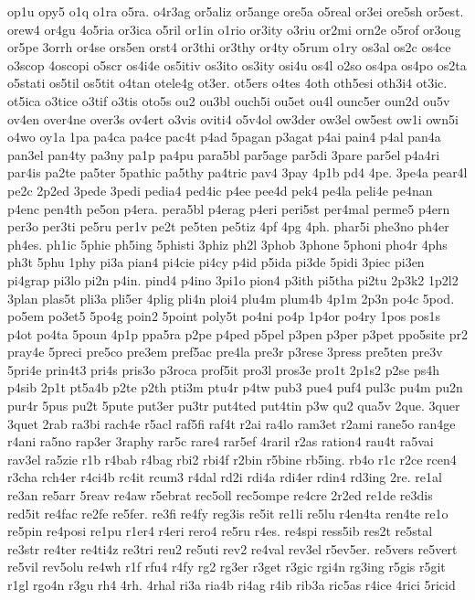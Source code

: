 {op1u
opy5
o1q
o1ra
o5ra.
o4r3ag
or5aliz
or5ange
ore5a
o5real
or3ei
ore5sh
or5est.
orew4
or4gu
4o5ria
or3ica
o5ril
or1in
o1rio
or3ity
o3riu
or2mi
orn2e
o5rof
or3oug
or5pe
3orrh
or4se
ors5en
orst4
or3thi
or3thy
or4ty
o5rum
o1ry
os3al
os2c
os4ce
o3scop
4oscopi
o5scr
os4i4e
os5itiv
os3ito
os3ity
osi4u
os4l
o2so
os4pa
os4po
os2ta
o5stati
os5til
os5tit
o4tan
otele4g
ot3er.
ot5ers
o4tes
4oth
oth5esi
oth3i4
ot3ic.
ot5ica
o3tice
o3tif
o3tis
oto5s
ou2
ou3bl
ouch5i
ou5et
ou4l
ounc5er
oun2d
ou5v
ov4en
over4ne
over3s
ov4ert
o3vis
oviti4
o5v4ol
ow3der
ow3el
ow5est
ow1i
own5i
o4wo
oy1a
1pa
pa4ca
pa4ce
pac4t
p4ad
5pagan
p3agat
p4ai
pain4
p4al
pan4a
pan3el
pan4ty
pa3ny
pa1p
pa4pu
para5bl
par5age
par5di
3pare
par5el
p4a4ri
par4is
pa2te
pa5ter
5pathic
pa5thy
pa4tric
pav4
3pay
4p1b
pd4
4pe.
3pe4a
pear4l
pe2c
2p2ed
3pede
3pedi
pedia4
ped4ic
p4ee
pee4d
pek4
pe4la
peli4e
pe4nan
p4enc
pen4th
pe5on
p4era.
pera5bl
p4erag
p4eri
peri5st
per4mal
perme5
p4ern
per3o
per3ti
pe5ru
per1v
pe2t
pe5ten
pe5tiz
4pf
4pg
4ph.
phar5i
phe3no
ph4er
ph4es.
ph1ic
5phie
ph5ing
5phisti
3phiz
ph2l
3phob
3phone
5phoni
pho4r
4phs
ph3t
5phu
1phy
pi3a
pian4
pi4cie
pi4cy
p4id
p5ida
pi3de
5pidi
3piec
pi3en
pi4grap
pi3lo
pi2n
p4in.
pind4
p4ino
3pi1o
pion4
p3ith
pi5tha
pi2tu
2p3k2
1p2l2
3plan
plas5t
pli3a
pli5er
4plig
pli4n
ploi4
plu4m
plum4b
4p1m
2p3n
po4c
5pod.
po5em
po3et5
5po4g
poin2
5point
poly5t
po4ni
po4p
1p4or
po4ry
1pos
pos1s
p4ot
po4ta
5poun
4p1p
ppa5ra
p2pe
p4ped
p5pel
p3pen
p3per
p3pet
ppo5site
pr2
pray4e
5preci
pre5co
pre3em
pref5ac
pre4la
pre3r
p3rese
3press
pre5ten
pre3v
5pri4e
prin4t3
pri4s
pris3o
p3roca
prof5it
pro3l
pros3e
pro1t
2p1s2
p2se
ps4h
p4sib
2p1t
pt5a4b
p2te
p2th
pti3m
ptu4r
p4tw
pub3
pue4
puf4
pul3c
pu4m
pu2n
pur4r
5pus
pu2t
5pute
put3er
pu3tr
put4ted
put4tin
p3w
qu2
qua5v
2que.
3quer
3quet
2rab
ra3bi
rach4e
r5acl
raf5fi
raf4t
r2ai
ra4lo
ram3et
r2ami
rane5o
ran4ge
r4ani
ra5no
rap3er
3raphy
rar5c
rare4
rar5ef
4raril
r2as
ration4
rau4t
ra5vai
rav3el
ra5zie
r1b
r4bab
r4bag
rbi2
rbi4f
r2bin
r5bine
rb5ing.
rb4o
r1c
r2ce
rcen4
r3cha
rch4er
r4ci4b
rc4it
rcum3
r4dal
rd2i
rdi4a
rdi4er
rdin4
rd3ing
2re.
re1al
re3an
re5arr
5reav
re4aw
r5ebrat
rec5oll
rec5ompe
re4cre
2r2ed
re1de
re3dis
red5it
re4fac
re2fe
re5fer.
re3fi
re4fy
reg3is
re5it
re1li
re5lu
r4en4ta
ren4te
re1o
re5pin
re4posi
re1pu
r1er4
r4eri
rero4
re5ru
r4es.
re4spi
ress5ib
res2t
re5stal
re3str
re4ter
re4ti4z
re3tri
reu2
re5uti
rev2
re4val
rev3el
r5ev5er.
re5vers
re5vert
re5vil
rev5olu
re4wh
r1f
rfu4
r4fy
rg2
rg3er
r3get
r3gic
rgi4n
rg3ing
r5gis
r5git
r1gl
rgo4n
r3gu
rh4
4rh.
4rhal
ri3a
ria4b
ri4ag
r4ib
rib3a
ric5as
r4ice
4rici
5ricid
}
